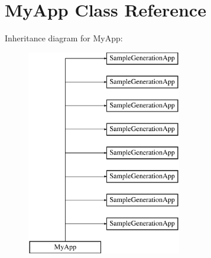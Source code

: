 \hypertarget{class_my_app}{}\section{My\+App Class Reference}
\label{class_my_app}
Inheritance diagram for My\+App\+:\begin{figure}[H]
\begin{center}
\leavevmode
\includegraphics[height=9.000000cm]{class_my_app}
\end{center}
\end{figure}
